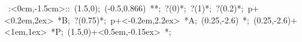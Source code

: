 %

\hbox{
\xy    <4cm,0cm>:<0cm,-1.5cm>::
       (1.5,0); (-0.5,0.866) **\dir{-}; ?(0)*\dir{<}; ?(1)*\dir{>};
       ?(0.2)*{\bullet}; p+<0.2em,2ex> *{B};
       ?(0.75)*{\bullet}; p+<-0.2em,2.2ex> *{A};
       (0.25,-2.6) *{\bullet};
       (0.25,-2.6)+<1em,1ex> *{P};
       (1.5,0)+<0.5em,-0.15ex> *{\ell};
\endxy}

